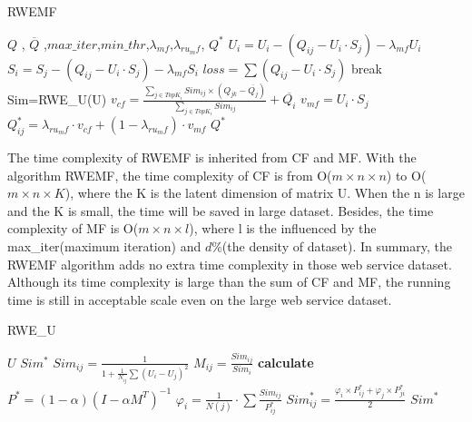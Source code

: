 \documentclass[conference]{IEEEtran}
\begin{document}
\begin{algorithm}  
\caption{RWEMF}  
\label{alg_RWEMF}  
\begin{algorithmic}
\REQUIRE $Q$ , $\overline{Q}$ ,$max\_iter$,$min\_thr$,$\lambda_{mf}$,$\lambda_{ru_mf}$,
\ENSURE $Q^{*}$
    \STATE $U_{i} =U_{i}-(Q_{ij}-U_{i} \cdot S_{j}) -\lambda_{mf} U_{i}$
    \STATE $S_{i} =S_{j}-(Q_{ij}-U_{i} \cdot S_{j}) -\lambda_{mf} S_{i}$
    \STATE $loss=\sum{(Q_{ij}-U_{i} \cdot S_{j})}$
        \STATE break
    \ENDIF 
\ENDFOR
\STATE Sim=RWE\_U(U)
        \STATE $v_{cf}=\frac{
  \sum_{j \in TopK_{i}}{Sim_{ij} \times (Q_{jk}-\overline{Q_{j}})}
  }{
  \sum_{j \in TopK_{i}}{Sim_{ij}}
}+\overline{Q_{i}} $    
        \STATE $v_{mf}= U_{i} \cdot S_{j}$
        \STATE $Q_{ij}^{*}= \lambda_{ru_mf} \cdot v_{cf} + (1-\lambda_{ru_mf}) \cdot v_{mf}$
    \ENDFOR
\ENDFOR
\RETURN $Q^{*}$
\end{algorithmic}  
\end{algorithm}  
\par The time complexity of RWEMF is inherited from CF and MF. With the algorithm RWEMF, the time complexity of CF is from O($m \times n \times n$) to O($m \times n \times K$), where the K is the latent dimension of matrix U. When the n is large and the K is small, the time will be saved in large dataset. Besides, the time complexity of MF is O($m \times n \times l$), where l is the influenced by the max\_iter(maximum iteration) and $d \%$(the density of dataset). In summary, the RWEMF algorithm adds no extra time complexity in those web service dataset. Although its time complexity is large than the sum of CF and MF, the running time\cite{wang_collaborative_2015} is still in acceptable scale even on the large web service dataset.

\begin{algorithm}  
\caption{RWE\_U}  
\label{alg_RWE}  
\begin{algorithmic}
\REQUIRE $U$ 
\ENSURE $Sim^{*}$
        \STATE $Sim_{ij}=\frac{1}{1+\frac{1}{N_{ij}}\sum{(U_{i}-U_{j})^2}}$
    \ENDFOR
\ENDFOR
        \STATE $M_{ij}=\frac{Sim_{ij}}{Sim_{i}}$
    \ENDFOR
\ENDFOR
\STATE \textbf{calculate} $P^{*}=(1-\alpha)(I-\alpha M^{T})^{-1}$
        \STATE $\varphi_{i}=\frac{1}{N(j)} \cdot \sum{\frac{Sim_{ij}}{P^{*}_{ij}}} $    
        \STATE $Sim_{ij}^{*}=\frac
{\varphi_{i} \times P^{*}_{ij} + \varphi_{j} \times P^{*}_{ji}
}{2}$
    \ENDFOR
\ENDFOR
\RETURN $Sim^{*}$
\end{algorithmic}  
\end{algorithm} 
\end{document}
